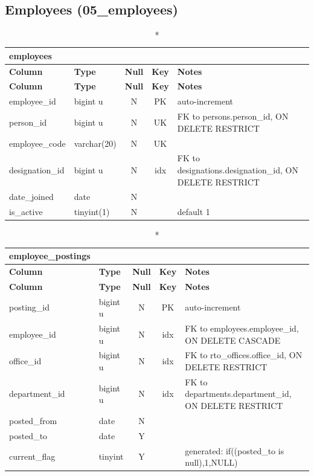 \subsection*{Employees (05\_employees)}
\begin{longtable}{@{}p{3.4cm}p{2.9cm}c c p{5.6cm}@{}}
\caption*{\textbf{employees}}\\
\toprule \textbf{Column} & \textbf{Type} & \textbf{Null} & \textbf{Key} & \textbf{Notes} \\ \midrule \endfirsthead
\toprule \textbf{Column} & \textbf{Type} & \textbf{Null} & \textbf{Key} & \textbf{Notes} \\ \midrule \endhead
\bottomrule \endlastfoot
employee\_\allowbreak{}id & bigint u & N & PK & auto-increment \\
person\_\allowbreak{}id & bigint u & N & UK & FK to persons.person\_\allowbreak{}id, ON DELETE RESTRICT \\
employee\_\allowbreak{}code & varchar(20) & N & UK &  \\
designation\_\allowbreak{}id & bigint u & N & idx & FK to designations.designation\_\allowbreak{}id, ON DELETE RESTRICT \\
date\_\allowbreak{}joined & date & N &  &  \\
is\_\allowbreak{}active & tinyint(1) & N &  & default 1 \\
\end{longtable}
\vspace{-0.4em}
\begin{longtable}{@{}p{3.4cm}p{2.9cm}c c p{5.6cm}@{}}
\caption*{\textbf{employee\_\allowbreak{}postings}}\\
\toprule \textbf{Column} & \textbf{Type} & \textbf{Null} & \textbf{Key} & \textbf{Notes} \\ \midrule \endfirsthead
\toprule \textbf{Column} & \textbf{Type} & \textbf{Null} & \textbf{Key} & \textbf{Notes} \\ \midrule \endhead
\bottomrule \endlastfoot
posting\_\allowbreak{}id & bigint u & N & PK & auto-increment \\
employee\_\allowbreak{}id & bigint u & N & idx & FK to employees.employee\_\allowbreak{}id, ON DELETE CASCADE \\
office\_\allowbreak{}id & bigint u & N & idx & FK to rto\_\allowbreak{}offices.office\_\allowbreak{}id, ON DELETE RESTRICT \\
department\_\allowbreak{}id & bigint u & N & idx & FK to departments.department\_\allowbreak{}id, ON DELETE RESTRICT \\
posted\_\allowbreak{}from & date & N &  &  \\
posted\_\allowbreak{}to & date & Y &  &  \\
current\_\allowbreak{}flag & tinyint & Y &  & generated: if((posted\_\allowbreak{}to is null),1,NULL) \\
\end{longtable}
\vspace{-0.4em}
